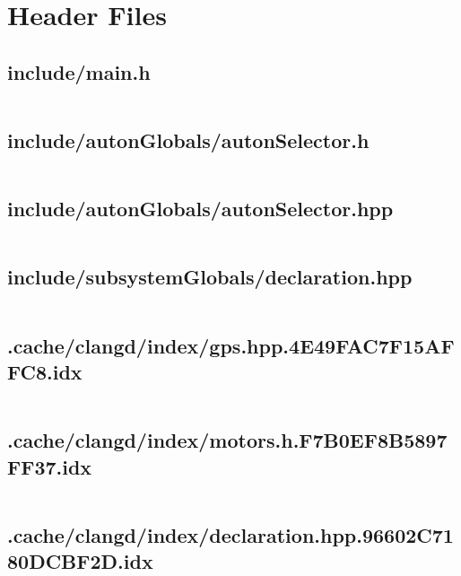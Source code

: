 \section{Header Files}

\subsection{include/main.h}
\inputminted[linenos,tabsize=2,breaklines, breakanywhere]{c}{main.h}
\pagebreak

\subsection{include/autonGlobals/autonSelector.h}
\inputminted[linenos,tabsize=2,breaklines, breakanywhere]{c}{autonSelector.h}
\pagebreak

\subsection{include/autonGlobals/autonSelector.hpp}
\inputminted[linenos,tabsize=2,breaklines, breakanywhere]{c}{autonSelector.hpp}
\pagebreak

\subsection{include/subsystemGlobals/declaration.hpp}
\inputminted[linenos,tabsize=2,breaklines, breakanywhere]{c}{declaration.hpp}
\pagebreak

\subsection{.cache/clangd/index/gps.hpp.4E49FAC7F15AFFC8.idx}
\inputminted[linenos,tabsize=2,breaklines, breakanywhere]{c}{gps.hpp.4E49FAC7F15AFFC8.idx}
\pagebreak

\subsection{.cache/clangd/index/motors.h.F7B0EF8B5897FF37.idx}
\inputminted[linenos,tabsize=2,breaklines, breakanywhere]{c}{motors.h.F7B0EF8B5897FF37.idx}
\pagebreak

\subsection{.cache/clangd/index/declaration.hpp.96602C7180DCBF2D.idx}
\inputminted[linenos,tabsize=2,breaklines, breakanywhere]{c}{declaration.hpp.96602C7180DCBF2D.idx}
\pagebreak

